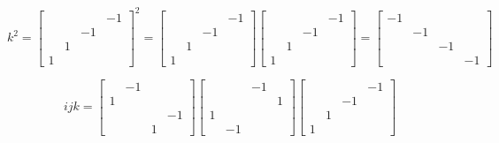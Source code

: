 \documentclass{article}
\begin{document}
\begin{enumerate}
    \[k^2=\left[
    \begin{array}{cccc}
     & & & -1 \\
     & & -1 \\
     & 1 \\
     1
    \end{array}
    \right]^2=
    \left[
    \begin{array}{cccc}
     & & & -1 \\
     & & -1 \\
     & 1 \\
     1
    \end{array}
    \right]
    \left[
    \begin{array}{cccc}
     & & & -1 \\
     & & -1 \\
     & 1 \\
     1
    \end{array}
    \right]=
    \left[
    \begin{array}{cccc}
    -1 \\ & -1 \\ & & -1 \\ & & & -1
    \end{array}
    \right]
    \]
    
    \[ijk =
    \left[
    \begin{array}{cccc}
     & -1 \\
    1 & \\
    &&& -1 \\
    && 1
    \end{array}
    \right]
    \left[
    \begin{array}{cccc}
     & & -1 \\
     & & & 1\\
    1 \\
    & -1
    \end{array}
    \right]
    \left[
    \begin{array}{cccc}
     & & & -1 \\
     & & -1\\
    & 1 \\
     1
    \end{array}
    \right]
    \]
    

\end{enumerate}
\end{document}
